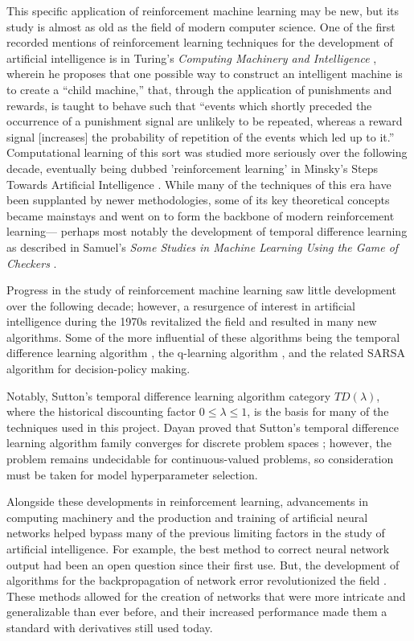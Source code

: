 This specific application of reinforcement machine learning may be new, 
but its study is almost as old as the field of modern computer science. 
One of the first recorded mentions of reinforcement learning techniques for the
development of artificial intelligence is in Turing's 
\emph{Computing Machinery and Intelligence} \cite{machinery1950computing}, 
wherein he proposes that one possible way to 
construct an intelligent machine is to create a ``child machine,'' that,
through the application of punishments and rewards, 
is taught to behave such that 
``events which shortly preceded the occurrence of a punishment signal are 
unlikely to be repeated, whereas a reward signal [increases] the probability 
of repetition of the events which led up to it.''
Computational learning of this sort was studied more seriously over the 
following decade, eventually being dubbed 'reinforcement learning' in Minsky's 
Steps Towards Artificial Intelligence \cite{minsky61}. 
While many of the techniques of this era have been supplanted by newer 
methodologies, some of its key theoretical concepts became mainstays and went 
on to form the backbone of modern reinforcement learning--- perhaps most 
notably the development of temporal difference learning as described in 
Samuel's \emph{Some Studies in Machine Learning Using the Game of Checkers}
\cite{samuel1959some}.

Progress in the study of reinforcement machine learning saw little development over the following decade; however, a resurgence of interest in artificial intelligence during the 1970s revitalized the field and resulted in many new algorithms. Some of the more influential of these algorithms being the temporal difference learning algorithm \cite{sutton1988learning}, the q-learning algorithm \cite{watkins1989learning}, and the related SARSA algorithm \cite{rummery1994line} for decision-policy making. 

Notably, Sutton's temporal difference learning algorithm category 
$TD(\lambda)$, 
where the historical discounting factor $0\le\lambda\le 1$, 
is the basis for many of the techniques used in this project. 
Dayan proved that Sutton's temporal difference learning algorithm 
family converges for discrete problem spaces \cite{dayan92}; 
however, the problem remains undecidable for continuous-valued problems, 
so consideration must be taken for model hyperparameter selection.

Alongside these developments in reinforcement learning, advancements in computing machinery and the production and training of artificial neural networks helped bypass many of the previous limiting factors in the study of artificial intelligence. For example, the best method to correct neural network output had been an open question since their first use. But, the development of algorithms for the backpropagation of network error revolutionized the field \cite{rumelhart1986learning}. These methods allowed for the creation of networks that were more intricate and generalizable than ever before, and their increased performance made them a standard with derivatives still used today.

